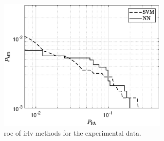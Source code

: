 \documentclass[final,twocolumn]{IEEEtran}
\begin{document}



\begin{figure}[t]
    \centering
    \includegraphics[width=8.5cm]{berlinNew.eps}
    \caption{\ac{roc} of \ac{irlv} methods for the experimental data.}
    \label{fig:Berlinnew}
\end{figure}
\end{document}
